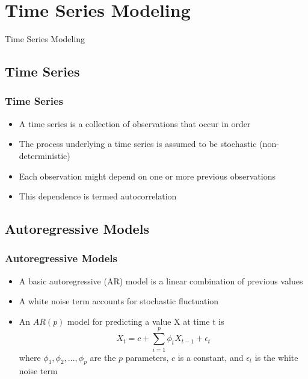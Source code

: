 \documentclass[presentation]{beamer}
\begin{document}
\section{Time Series Modeling}


\begin{frame}
\begin{center}
\Large{Time Series Modeling}
\end{center}
\end{frame}


\subsection{Time Series}

\begin{frame}[t]
\frametitle{Time Series }
\begin{itemize}
\item{A time series is a collection of observations that occur in order}
\item{The process underlying a time series is assumed to be stochastic (non-deterministic)}
\item{Each observation might depend on one or more previous observations}
\item{This dependence is termed autocorrelation}
\end{itemize}
\end{frame}

\subsection{Autoregressive Models}

\begin{frame}[t]
\frametitle{Autoregressive Models}
\begin{itemize}
\item{A basic autoregressive (AR) model is a linear combination of previous values}
\item{A white noise term accounts for stochastic fluctuation}
\item{An $AR(p)$ model for predicting a value X at time t is
\begin{equation}
X_t=c+\sum_{i=1}^{p}{\phi_t X_{t-1}+\epsilon_t}
\end{equation}
where $\phi_1, \phi_2, ..., \phi_p$ are the $p$ parameters, $c$ is a constant, and $\epsilon_t$ is the white noise term}
\end{itemize}
\end{frame}
\end{document}
